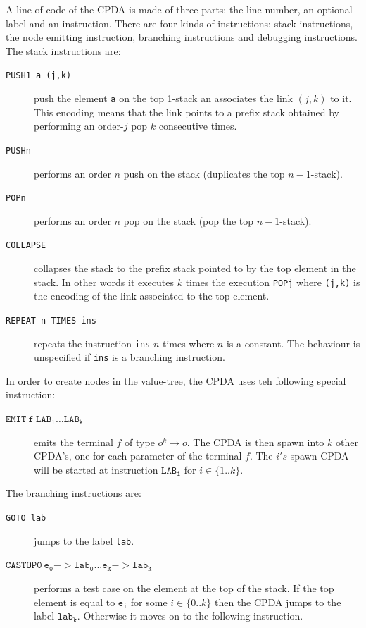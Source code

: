 A line of code of the CPDA is made of three parts: the line number, an optional label and an instruction. There are four kinds of instructions: stack instructions, the node emitting instruction, branching instructions and debugging instructions. The stack instructions are:
\begin{description}
  \item[{\tt PUSH1 a (j,k)}] push the element {\tt a} on the top 1-stack an associates the link $(j,k)$ to it. This encoding means that the link points to a prefix stack obtained by performing an order-$j$ pop $k$ consecutive times.
  \item[{\tt PUSHn}] performs an order $n$ push on the stack (duplicates the top $n-1$-stack).
  \item[{\tt POPn}] performs an order $n$ pop on the stack (pop the top $n-1$-stack).
  \item[{\tt COLLAPSE}] collapses the stack to the prefix stack pointed to by the top element in the stack. In other words it executes $k$ times the execution {\tt POPj} where {\tt (j,k)} is the encoding of the link associated to the top element.

  \item[{\tt REPEAT n TIMES ins}] repeats the instruction {\tt ins} $n$ times where $n$ is a constant. The behaviour is unspecified if {\tt ins} is a branching instruction.
\end{description}

In order to create nodes in the value-tree, the CPDA uses teh following special instruction:
\begin{description}
  \item[$\mathtt{EMIT\ f\ LAB_1 \ldots LAB_k}$] emits the terminal $f$ of type $o^k \rightarrow o$.
   The CPDA is then spawn into $k$ other CPDA's, one for each parameter of the terminal $f$.
   The $i's$ spawn CPDA will be started at instruction $\mathtt{LAB_i}$ for $i \in \{1..k\}$.
\end{description}

The branching instructions are:
\begin{description}
  \item[{\tt GOTO lab}] jumps to the label {\tt lab}.
  \item[$\mathtt{CASTOP0\ e_0->lab_0 ... e_k->lab_k}$] performs a test case on the element
  at the top of the stack. If the top element is equal to $\mathtt{e_i}$ for some $i \in \{0..k\}$
  then the CPDA jumps to the label $\mathtt{lab_k}$. Otherwise it moves on to the following instruction.
\end{description}

